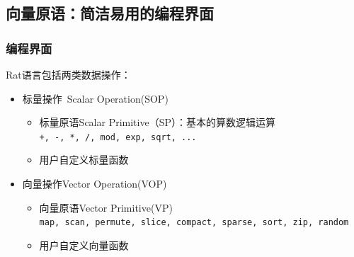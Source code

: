 \documentclass{beamer}
\begin{document}
\subsection{向量原语：简洁易用的编程界面}
\begin{frame}
  \frametitle{编程界面}
  Rat语言包括两类数据操作：
  \begin{itemize}
    \item<1-> 标量操作~Scalar Operation(SOP)
      \begin{itemize}
        \item 标量原语Scalar Primitive（SP）：基本的算数逻辑运算\\
          \texttt{+, -, *, /, mod, exp, sqrt, ...}
        \item 用户自定义标量函数
      \end{itemize}
    \item<2-> 向量操作Vector Operation(VOP)
      \begin{itemize}
        \item 向量原语Vector Primitive(VP)\\
          \texttt{map, scan, permute, slice, compact, sparse, sort, zip, random}
        \item 用户自定义向量函数
      \end{itemize}
  \end{itemize}
\end{frame}
\end{document}
